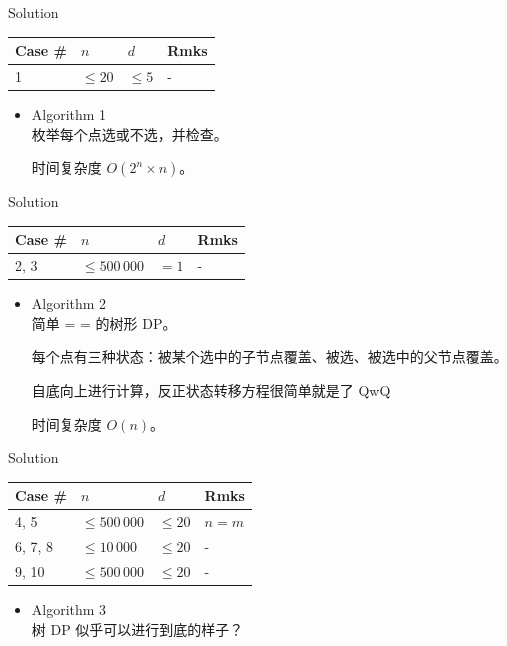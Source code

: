 \documentclass[UTF8]{beamer}
\begin{document}
\begin{frame}{Solution}

\begin{tabularx}{\textwidth}{X|X|X|X} \hline
Case \# & $n$ & $d$ & Rmks \\ \hline \hline
1       & $\leq 20$       & $\leq 5$  & - \\ \hline
\end{tabularx}
\begin{itemize}
    \item Algorithm 1 \\
        枚举每个点选或不选，并检查。

        时间复杂度 $O(2^n \times n)$。
\end{itemize}

\end{frame}

\begin{frame}{Solution}

\begin{tabularx}{\textwidth}{X|X|X|X} \hline
Case \# & $n$ & $d$ & Rmks \\ \hline \hline
2, 3    & $\leq 500\,000$ & $= 1$     & - \\ \hline
\end{tabularx}
\begin{itemize}
    \item Algorithm 2 \\
        简单 = = 的树形 DP。

        每个点有三种状态：被某个选中的子节点覆盖、被选、被选中的父节点覆盖。

        自底向上进行计算，反正状态转移方程很简单就是了 QwQ

        时间复杂度 $O(n)$。
\end{itemize}

\end{frame}

\begin{frame}{Solution}

\begin{tabularx}{\textwidth}{X|X|X|X} \hline
Case \# & $n$ & $d$ & Rmks \\ \hline \hline
4, 5    & $\leq 500\,000$ & $\leq 20$ & $n = m$ \\ \hline
6, 7, 8 & $\leq 10\,000$  & $\leq 20$ & - \\ \hline
9, 10   & $\leq 500\,000$ & $\leq 20$ & - \\ \hline
\end{tabularx}
\begin{itemize}
    \item Algorithm 3 \\
        树 DP 似乎可以进行到底的样子？
\end{itemize}

\end{frame}
\end{document}
